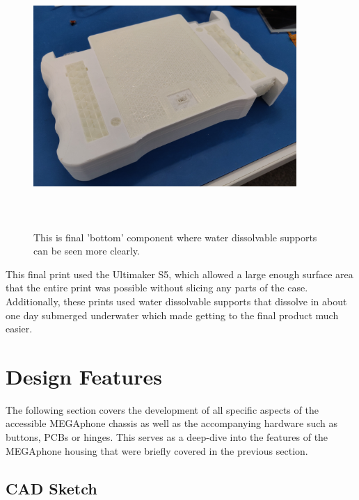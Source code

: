 \begin{figure} [h]
    \centering
    \includegraphics[width=10cm,height=10cm,keepaspectratio]{Figures/bottomwatersupport.png}
    \caption{This is final 'bottom' component where water dissolvable supports can be seen more clearly.}
    \label{fig:thirdbottom}
\end{figure}

This final print used the Ultimaker S5, which allowed a large enough surface area that the entire print was possible without slicing any parts of the case.
Additionally, these prints used water dissolvable supports that dissolve in about one day submerged underwater which made getting to the final product much easier.

\section{Design Features}

The following section covers the development of all specific aspects of the accessible MEGAphone chassis as well as the accompanying hardware such as buttons, PCBs or hinges.
This serves as a deep-dive into the features of the MEGAphone housing that were briefly covered in the previous section.

\subsection{CAD Sketch}

